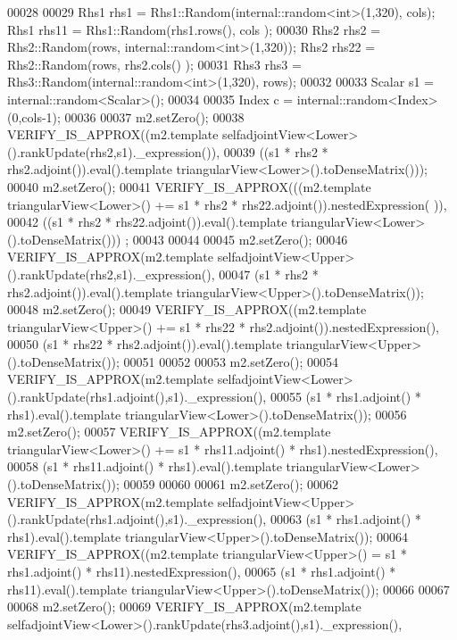 \begin{DoxyCode}
00028 
00029   Rhs1 rhs1 = Rhs1::Random(internal::random<int>(1,320), cols); Rhs1 rhs11 = Rhs1::Random(rhs1.rows(), cols
      );
00030   Rhs2 rhs2 = Rhs2::Random(rows, internal::random<int>(1,320)); Rhs2 rhs22 = Rhs2::Random(rows, rhs2.cols()
      );
00031   Rhs3 rhs3 = Rhs3::Random(internal::random<int>(1,320), rows);
00032 
00033   Scalar s1 = internal::random<Scalar>();
00034   
00035   Index c = internal::random<Index>(0,cols-1);
00036 
00037   m2.setZero();
00038   VERIFY\_IS\_APPROX((m2.template selfadjointView<Lower>().rankUpdate(rhs2,s1).\_expression()),
00039                    ((s1 * rhs2 * rhs2.adjoint()).eval().template triangularView<Lower>().toDenseMatrix()));
00040   m2.setZero();
00041   VERIFY\_IS\_APPROX(((m2.template triangularView<Lower>() += s1 * rhs2  * rhs22.adjoint()).nestedExpression(
      )),
00042                    ((s1 * rhs2 * rhs22.adjoint()).eval().template triangularView<Lower>().toDenseMatrix()))
      ;
00043 
00044   
00045   m2.setZero();
00046   VERIFY\_IS\_APPROX(m2.template selfadjointView<Upper>().rankUpdate(rhs2,s1).\_expression(),
00047                    (s1 * rhs2 * rhs2.adjoint()).eval().template triangularView<Upper>().toDenseMatrix());
00048   m2.setZero();
00049   VERIFY\_IS\_APPROX((m2.template triangularView<Upper>() += s1 * rhs22 * rhs2.adjoint()).nestedExpression(),
00050                    (s1 * rhs22 * rhs2.adjoint()).eval().template triangularView<Upper>().toDenseMatrix());
00051 
00052   
00053   m2.setZero();
00054   VERIFY\_IS\_APPROX(m2.template selfadjointView<Lower>().rankUpdate(rhs1.adjoint(),s1).\_expression(),
00055                    (s1 * rhs1.adjoint() * rhs1).eval().template triangularView<Lower>().toDenseMatrix());
00056   m2.setZero();
00057   VERIFY\_IS\_APPROX((m2.template triangularView<Lower>() += s1 * rhs11.adjoint() * rhs1).nestedExpression(),
00058                    (s1 * rhs11.adjoint() * rhs1).eval().template triangularView<Lower>().toDenseMatrix());
00059   
00060   
00061   m2.setZero();
00062   VERIFY\_IS\_APPROX(m2.template selfadjointView<Upper>().rankUpdate(rhs1.adjoint(),s1).\_expression(),
00063                    (s1 * rhs1.adjoint() * rhs1).eval().template triangularView<Upper>().toDenseMatrix());
00064   VERIFY\_IS\_APPROX((m2.template triangularView<Upper>() = s1 * rhs1.adjoint() * rhs11).nestedExpression(),
00065                    (s1 * rhs1.adjoint() * rhs11).eval().template triangularView<Upper>().toDenseMatrix());
00066 
00067   
00068   m2.setZero();
00069   VERIFY\_IS\_APPROX(m2.template selfadjointView<Lower>().rankUpdate(rhs3.adjoint(),s1).\_expression(),

\end{DoxyCode}
